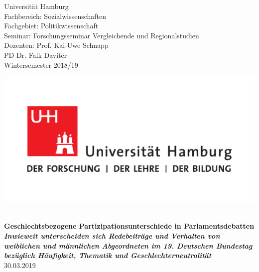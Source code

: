 \documentclass[12pt, 
    twoside=false, 
    bibliography=totoc, 
    numbers=endperiod, 
    headings=normal, 
    toc=chapterentrydotfill
    ]{scrbook}
\begin{document}
\begin{titlepage}
    \begin{minipage}[t]{0.6\textwidth}
    \flushleft 
    Universität Hamburg \\
    Fachbereich: Sozialwissenschaften \\
    Fachgebiet: Politikwissenschaft \\
    Seminar: Forschungsseminar Vergleichende und Regionalstudien \\ 
    Dozenten: Prof. Kai-Uwe Schnapp \\
    PD Dr. Falk Daviter \\
    Wintersemester 2018/19 \\
    \end{minipage}
    \hfill
    \begin{minipage}[t][1.7cm][b]{0.35\textwidth}
    \includegraphics[width=\textwidth]{images/UHH-Logo_2010_Farbe_CMYK.pdf}
    \end{minipage}
    
    \vspace*{\fill}
    \begin{center}
	\vspace{1cm} \vspace{0.2cm} \\
	\textbf{\Large Geschlechtsbezogene Partizipationsunterschiede in Parlamentsdebatten \\
	\vspace {0,5cm} \small\emph{Inwieweit unterscheiden sich Redebeiträge und Verhalten von weiblichen und männlichen Abgeordneten im 19. Deutschen Bundestag bezüglich Häufigkeit, Thematik und Geschlechterneutralität}} \\
	\vspace{0.5cm}
	30.03.2019
	\end{center}
    \vspace*{\fill}
	

\end{titlepage}
\end{document}
